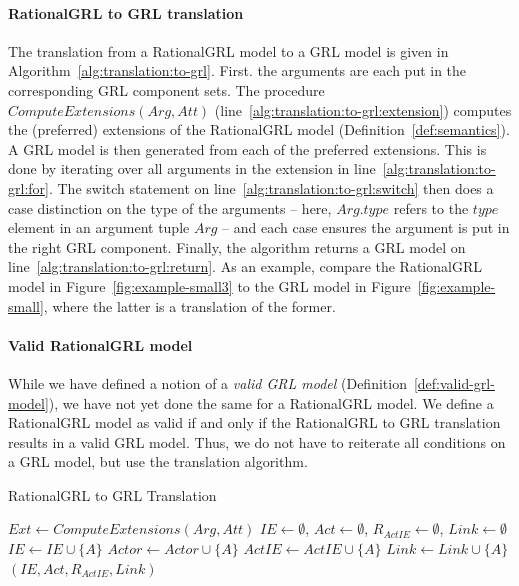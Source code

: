 \paragraph{RationalGRL to GRL translation} The translation from a RationalGRL model to a GRL model is given in Algorithm~\ref{alg:translation:to-grl}. First. the arguments are each put in the corresponding GRL component sets. The procedure $ComputeExtensions(Arg,Att)$ (line~\ref{alg:translation:to-grl:extension}) computes the (preferred) extensions of the RationalGRL model (Definition~\ref{def:semantics}). A GRL model is then generated from each of the preferred extensions. This is done by iterating over all arguments in the extension in line~\ref{alg:translation:to-grl:for}. The switch statement on line~\ref{alg:translation:to-grl:switch} then does a case distinction on the type of the arguments -- here, $Arg.type$ refers to the $type$ element in an argument tuple $Arg$ -- and each case ensures the argument is put in the right GRL component. Finally, the algorithm returns a GRL model on line~\ref{alg:translation:to-grl:return}. As an example, compare the RationalGRL model in Figure~\ref{fig:example-small3} to the GRL model in Figure~\ref{fig:example-small}, where the latter is a translation of the former.

\paragraph{Valid RationalGRL model} While we have defined a notion of a \emph{valid GRL model} (Definition~\ref{def:valid-grl-model}), we have not yet done the same for a RationalGRL model. We define a RationalGRL model as valid if and only if the RationalGRL to GRL translation results in a valid GRL model. Thus, we do not have to reiterate all conditions on a GRL model, but use the translation algorithm.

\begin{algorithm}[b]
  \caption{RationalGRL to GRL Translation}
  \label{alg:translation:to-grl}
  \begin{algorithmic}[1]
    \State $Ext \leftarrow ComputeExtensions(Arg,Att)$\label{alg:translation:to-grl:extension}
    \State $IE\leftarrow\emptyset$, $Act\leftarrow\emptyset$, $R_{ActIE}\leftarrow\emptyset$, $Link\leftarrow \emptyset$
    \label{alg:translation:to-grl:for}
      \label{alg:translation:to-grl:switch}
            \State $IE\leftarrow IE\cup \{A\}$
          \EndCase
            \State $Actor\leftarrow Actor\cup \{A\}$
          \EndCase
            \State $ActIE\leftarrow ActIE\cup \{A\}$
          \EndCase
            \State $Link\leftarrow Link \cup\{A\}$
          \EndCase
      \EndSwitch
    \EndFor
    \State \Return $(IE,Act,R_{ActIE}, Link)$\label{alg:translation:to-grl:return}
    \EndFor
    \EndProcedure
  \end{algorithmic}
\end{algorithm}

